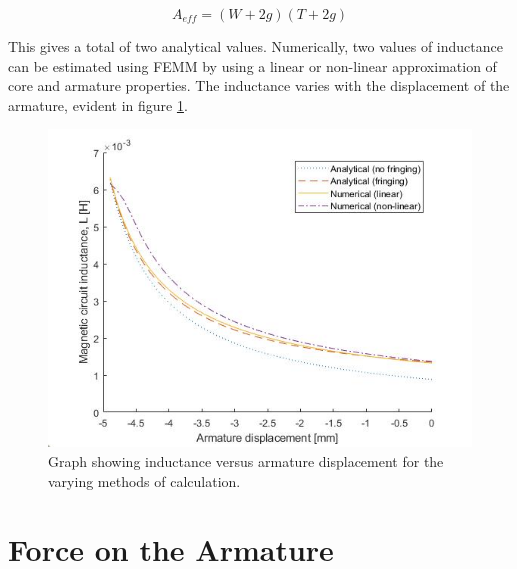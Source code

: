 \documentclass[a4paper]{IEEEtran}
\begin{document}
\begin{equation}
A_{eff} = (W + 2g)(T + 2g)
\label{EffectiveArea}
\end{equation}

This gives a total of two analytical values. Numerically, two values of inductance can be estimated using FEMM by using a linear or non-linear approximation of core and armature properties. The inductance varies with the displacement of the armature, evident in figure \ref{inductanceGraph}.

\begin{figure}[ht]
\includegraphics[width = \linewidth]{Inductances.jpg}
\caption{Graph showing inductance versus armature displacement for the varying methods of calculation.}
\label{inductanceGraph} 
\end{figure}


\section{Force on the Armature}
\end{document}
